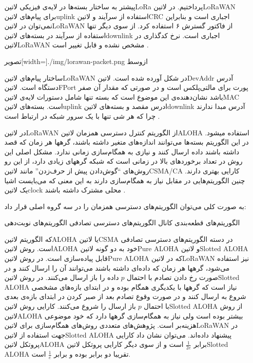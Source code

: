 پیشتر به ساختار بسته‌ها در لایه‌ی فیزیکی ‌لاتین{LoRa} پرداختیم. در ‌لاتین{LoRaWAN} برای پیام‌های ‌لاتین{uplink} استفاده از سرآیند و ‌لاتین{CRC} اجباری است
و بنابراین نمی‌توان در ‌لاتین{LoRaWAN} از فاکتور گسترش ۶ استفاده کرد. از سوی دیگر تنها استفاده از سرآیند در بسته‌های ‌لاتین{downlink} اجباری است.
نرخ کدگذاری در ‌لاتین{LoRaWAN} مشخص نشده و قابل تغییر است
.

‌تصویر[width=\textwidth]{./img/lorawan-packet.png}
‌ازوسط

ساختار پیام‌های ‌لاتین{LoRaWAN} در شکل  آورده شده است. ‌لاتین{DevAddr} آدرس دستگاه است.
‌لاتین{FPort} پورت برای مالتی‌پلکس است و در صورتی که مقدار آن صفر باشد نشان‌دهنده‌ی این موضوع است که بسته تنها شامل
دستورات لایه‌ی ‌لاتین{MAC} است. بسته‌های ‌لاتین{uplink} ادرس مقصد و بسته‌های ‌لاتین{downlink} آدرس مبدا ندارند
چرا که هر شی تنها با یک سرور شبکه در ارتباط است
.

در ‌لاتین{LoRaWAN} از الگوریتم کنترل دسترسی همزمان ‌لاتین{ALOHA} استفاده میشود. در این الگوریتم بسته‌ها می‌توانند اندازه‌های متغیر داشته باشند، گرهها هر زمان که قصد داشته باشند داده ارسال کنند و نیازی به همگام‌سازی زمانی ندارد.
مشکل اصلی این روش در تعداد برخوردهای بالا در زمانی است که شبکه گرههای زیادی دارد، از این رو روش‌های ``گوش‌دادن پیش از حرف‌زدن'' مانند ‌لاتین{CSMA/CA} کارایی بهتری دارند.
چنین الگوریتم‌هایی در مقابل نیاز به همگام‌سازی دارند به این معنی که می‌بایست اشیا یک ‌لاتین{clock} محلی مشترک داشته باشند
.

به صورت کلی می‌توان الگوریتم‌های دسترسی همزمان را در سه گروه اصلی قرار داد:

 الگوریتم‌های قطعه‌بندی کانال
 الگوریتم‌های دسترسی تصادفی
 الگوریتم‌های نوبت‌دهی

که الگوریتم ‌لاتین{ALOHA} یا ‌لاتین{CSMA} در دسته الگوریتم‌های دسترسی تصادفی است.
روش ‌لاتین{ALOHA} خود به دو گونه ‌لاتین{Pure ALOHA} و ‌لاتین{Slotted ALOHA}
قابل پیاده‌سازی است. در روش ‌لاتین{Pure ALOHA} که در ‌لاتین{LoRaWAN} نیز استفاده می‌شود، گرهها هر زمان که داده‌ای داشته باشند می‌توانند آن را ارسال کنند و در صورت رخ دادن تصادم
با احتمال $p$ داده را باز ارسال می‌کنند. در روش ‌لاتین{Slotted ALOHA} نیاز است که گرهها با یکدیگری همگام بوده و در ابتدای بازه‌های مشخصی شروع به ارسال کنند و در صورت
وقوع تصادم بعد از صبر کردن در ابتدای بازه‌ی بعدی با احتمال $p$ باز ارسال را شروع می‌کنند. کارایی روش ‌لاتین{Slotted ALOHA} از روش ‌لاتین{ALOHA} بیشتر بوده است ولی نیاز به همگام‌سازی گرهها دارد
که خود موضوعی هزینه‌بر است. پژوهش‌های متعددی روش‌های همگام‌سازی برای ‌لاتین{LoRaWAN} در جهت استفاده از ‌لاتین{Slotted ALOHA} پیشنهاد داده‌اند.
می‌توان نشان داد کارایی پروتکل ‌لاتین{ALOHA} برابر $\frac{1}{2e}$ است و از سوی دیگر کارایی پروتکل ‌لاتین{Slotted ALOHA} تقریبا دو برابر بوده و برابر $\frac{1}{e}$ است.

